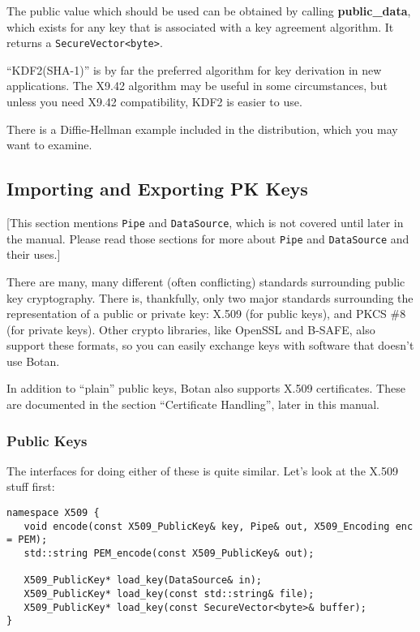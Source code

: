 \documentclass{article}
\newcommand{\function}[1]{\textbf{#1}}
\newcommand{\type}[1]{\texttt{#1}}
\begin{document}
The public value which should be used can be obtained by calling
\function{public\_data}, which exists for any key that is associated with a
key agreement algorithm. It returns a \type{SecureVector<byte>}.

``KDF2(SHA-1)'' is by far the preferred algorithm for key derivation in new
applications. The X9.42 algorithm may be useful in some circumstances, but
unless you need X9.42 compatibility, KDF2 is easier to use.

There is a Diffie-Hellman example included in the distribution, which you may
want to examine.

\subsection{Importing and Exporting PK Keys}

[This section mentions \type{Pipe} and \type{DataSource}, which is not covered
until later in the manual. Please read those sections for more about
\type{Pipe} and \type{DataSource} and their uses.]

There are many, many different (often conflicting) standards surrounding public
key cryptography. There is, thankfully, only two major standards surrounding
the representation of a public or private key: X.509 (for public keys), and
PKCS \#8 (for private keys). Other crypto libraries, like OpenSSL and B-SAFE,
also support these formats, so you can easily exchange keys with software that
doesn't use Botan.

In addition to ``plain'' public keys, Botan also supports X.509 certificates.
These are documented in the section ``Certificate Handling'', later in this
manual.

\subsubsection{Public Keys}

The interfaces for doing either of these is quite similar. Let's look at the
X.509 stuff first:
\begin{verbatim}
namespace X509 {
   void encode(const X509_PublicKey& key, Pipe& out, X509_Encoding enc = PEM);
   std::string PEM_encode(const X509_PublicKey& out);

   X509_PublicKey* load_key(DataSource& in);
   X509_PublicKey* load_key(const std::string& file);
   X509_PublicKey* load_key(const SecureVector<byte>& buffer);
}
\end{verbatim}
\end{document}
